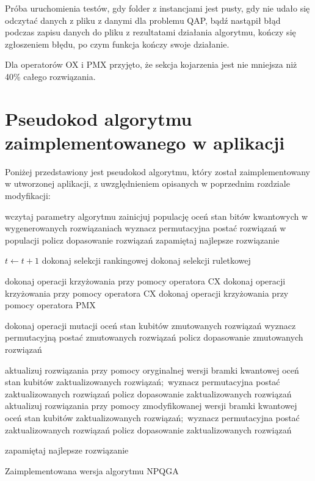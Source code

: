 Próba uruchomienia testów, gdy folder z instancjami jest pusty, gdy nie udało się odczytać danych z pliku z danymi dla problemu QAP, bądź nastąpił błąd podczas zapisu danych do pliku z rezultatami działania algorytmu, kończy się zgłoszeniem błędu, po czym funkcja kończy swoje działanie.

Dla operatorów OX i PMX przyjęto, że sekcja kojarzenia jest nie mniejsza niż 40\% całego rozwiązania.

\section{Pseudokod algorytmu zaimplementowanego w aplikacji}
Poniżej przedstawiony jest pseudokod algorytmu, który został zaimplementowany w utworzonej aplikacji, z uwzględnieniem opisanych w poprzednim rozdziale modyfikacji:

\newpage
\begin{small}
\begin{algorithm}[H]
	wczytaj parametry algorytmu\;	
	zainicjuj populację\;
	oceń stan bitów kwantowych w wygenerowanych rozwiązaniach\;
	wyznacz permutacyjna postać rozwiązań w populacji\;
	policz dopasowanie rozwiązań\;
	zapamiętaj najlepsze rozwiązanie\;
 	{ 
 		$t\leftarrow t+1$\;
		{
			dokonaj selekcji rankingowej\;
		}
		\Else
		{
			dokonaj selekcji ruletkowej\;
		}
		
		{
			dokonaj operacji krzyżowania przy pomocy operatora CX\;
		}
		{
			dokonaj operacji krzyżowania przy pomocy operatora CX\;
		}
		\Else
		{
			dokonaj operacji krzyżowania przy pomocy operatora PMX\;
		}
		
		dokonaj operacji mutacji\;
		oceń stan kubitów zmutowanych rozwiązań\;
		wyznacz permutacyjną postać zmutowanych rozwiązań\;
		policz dopasowanie zmutowanych rozwiązań\;	
		
		{
			aktualizuj rozwiązania przy pomocy oryginalnej wersji bramki kwantowej\;
			oceń stan kubitów zaktualizowanych rozwiązań;\
			wyznacz permutacyjna postać zaktualizowanych rozwiązań\;
			policz dopasowanie zaktualizowanych rozwiązań\;
		}
		{
			aktualizuj rozwiązania przy pomocy zmodyfikowanej wersji bramki kwantowej\;
			oceń stan kubitów zaktualizowanych rozwiązań;\
			wyznacz permutacyjna postać zaktualizowanych rozwiązań\;
			policz dopasowanie zaktualizowanych rozwiązań\;
		}
		
		zapamiętaj najlepsze rozwiązanie\;
 	}
 	\caption{Zaimplementowana wersja algorytmu NPQGA}
\end{algorithm}
\end{small}